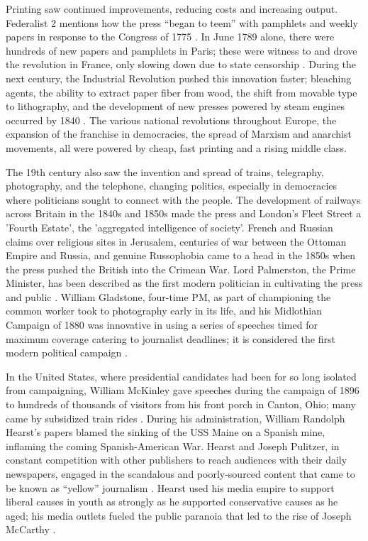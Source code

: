 Printing saw continued improvements, reducing costs and increasing output.
Federalist 2 mentions how the press ``began to teem'' with pamphlets and weekly papers in response to the Congress of 1775 \cite{fed}.
In June 1789 alone, there were hundreds of new papers and pamphlets in Paris; these were witness to and drove the revolution in France, only slowing down due to state censorship \cite[ch. 8]{popkin2019}.
During the next century, the Industrial Revolution pushed this innovation faster; bleaching agents, the ability to extract paper fiber from wood, the shift from movable type to lithography, and the development of new presses powered by steam engines occurred by 1840 \cite[pp. 3-5, 224]{bloom2001}.
The various national revolutions throughout Europe, the expansion of the franchise in democracies, the spread of Marxism and anarchist movements, all were powered by cheap, fast printing and a rising middle class.

The 19th century also saw the invention and spread of trains, telegraphy, photography, and the telephone, changing politics, especially in democracies where politicians sought to connect with the people.
The development of railways across Britain in the 1840s and 1850s made the press and London's Fleet Street a 'Fourth Estate', the 'aggregated intelligence of society'.
French and Russian claims over religious sites in Jerusalem, centuries of war between the Ottoman Empire and Russia, and genuine Russophobia came to a head in the 1850s when the press pushed the British into the Crimean War.
Lord Palmerston, the Prime Minister, has been described as the first modern politician in cultivating the press and public \cite[pp. 147-149]{figes2011}.
William Gladstone, four-time PM, as part of championing the common worker took to photography early in its life, and his Midlothian Campaign of 1880 was innovative in using a series of speeches timed for maximum coverage catering to journalist deadlines; it is considered the first modern political campaign \cite[p. 204]{brighton2015}.

In the United States, where presidential candidates had been for so long isolated from campaigning, William McKinley gave speeches during the campaign of 1896 to hundreds of thousands of visitors from his front porch in Canton, Ohio; many came by subsidized train rides \cite[p. 52]{harpine2006} \cite[pp. 130-131]{williams2010}.
During his administration, William Randolph Hearst's papers blamed the sinking of the USS Maine on a Spanish mine, inflaming the coming Spanish-American War.
Hearst and Joseph Pulitzer, in constant competition with other publishers to reach audiences with their daily newspapers, engaged in the scandalous and poorly-sourced content that came to be known as ``yellow'' journalism \cite[pp. 4-5, 219]{thomas2010}.
Hearst used his media empire to support liberal causes in youth as strongly as he supported conservative causes as he aged; his media outlets fueled the public paranoia that led to the rise of Joseph McCarthy \cite{carlisle1996}.

